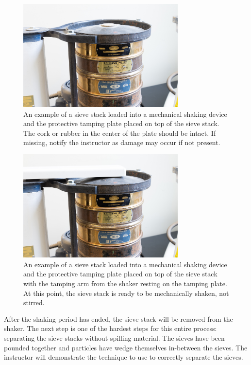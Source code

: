 \documentclass[12pt]{article}
\begin{document}
\begin{figure}[H]
    \centering
    \includegraphics[width=0.75\textwidth]{GEO_5722.jpg}
    \caption{An example of a sieve stack loaded into a mechanical shaking device and the protective tamping plate placed on top of the sieve stack. The cork or rubber in the center of the plate should be intact. If missing, notify the instructor as damage may occur if not present.}
    \label{fig:propertampingplate}
\end{figure}

\begin{figure}[H]
    \centering
    \includegraphics[width=0.75\textwidth]{GEO_5723.jpg}
    \caption{An example of a sieve stack loaded into a mechanical shaking device and the protective tamping plate placed on top of the sieve stack with the tamping arm from the shaker resting on the tamping plate. At this point, the sieve stack is ready to be mechanically shaken, not stirred.}
    \label{fig:propertampingarm}
\end{figure}

After the shaking period has ended, the sieve stack will be removed from the shaker. The next step is one of the hardest steps for this entire process: separating the sieve stacks without spilling material. The sieves have been pounded together and particles have wedge themselves in-between the sieves. The instructor will demonstrate the technique to use to correctly separate the sieves.
\end{document}
